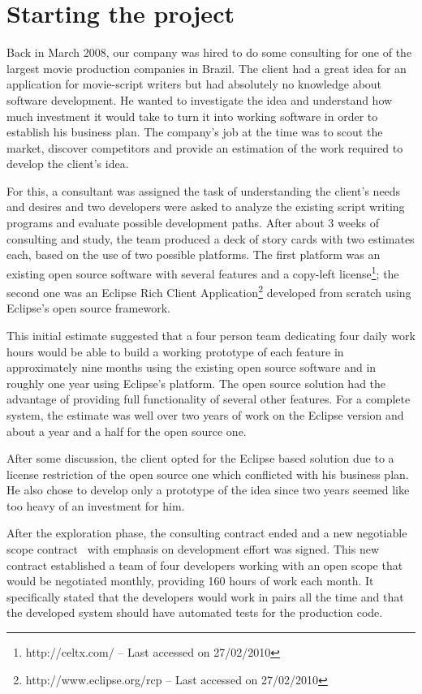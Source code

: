 \documentclass[lnbip]{svmultln}
\begin{document}
\section{Starting the project}
\label{sec:start}

Back in March 2008, our company was hired to do some consulting for
one of the largest movie production companies in Brazil. The client
had a great idea for an application for movie-script writers but had
absolutely no knowledge about software development.  He wanted to
investigate the idea and understand how much investment it would take
to turn it into working software in order to establish his business
plan. The company's job at the time was to scout the market, discover
competitors and provide an estimation of the work required to develop
the client's idea.

For this, a consultant was assigned the task of understanding the
client's needs and desires and two developers were asked to analyze
the existing script writing programs and evaluate possible development
paths. After about 3 weeks of consulting and study, the team produced
a deck of story cards with two estimates each, based on the use of two
possible platforms. The first platform was an existing open source
software with several features and a copy-left
license\footnote{http://celtx.com/ -- Last accessed on 27/02/2010};
the second one was an Eclipse Rich Client
Application\footnote{http://www.eclipse.org/rcp -- Last accessed on
  27/02/2010} developed from scratch using Eclipse's open source
framework.

This initial estimate suggested that a four person team dedicating
four daily work hours would be able to build a working prototype of
each feature in approximately nine months using the existing open
source software and in roughly one year using Eclipse's platform. The
open source solution had the advantage of providing full functionality
of several other features. For a complete system, the estimate was
well over two years of work on the Eclipse version and about a year
and a half for the open source one.

After some discussion, the client opted for the Eclipse based solution
due to a license restriction of the open source one which conflicted
with his business plan. He also chose to develop only a prototype of
the idea since two years seemed like too heavy of an investment for
him.

After the exploration phase, the consulting contract ended and a new
negotiable scope contract~\cite{XP} with emphasis on development
effort was signed. This new contract established a team of four
developers working with an open scope that would be negotiated
monthly, providing 160 hours of work each month. It specifically
stated that the developers would work in pairs all the time and that
the developed system should have automated tests for the production
code.
\end{document}
